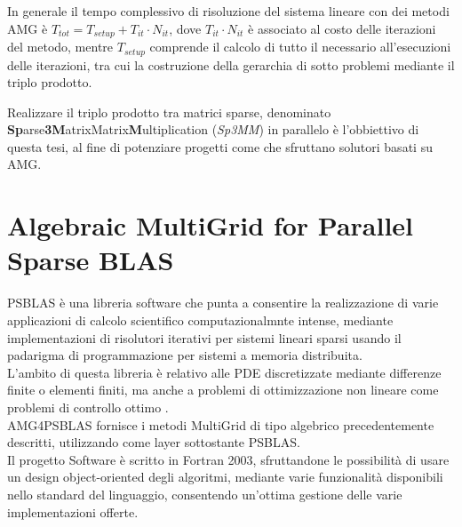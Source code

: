 In generale il tempo complessivo di risoluzione del sistema lineare con dei metodi AMG è  $T_{tot} = T_{setup} + T_{it}\cdot N_{it}$,
dove $T_{it}\cdot N_{it}$ è associato al costo delle iterazioni del metodo, 
mentre $T_{setup}$ comprende il calcolo di tutto il necessario all'esecuzioni delle iterazioni,
tra cui la costruzione della gerarchia di sotto problemi mediante il triplo prodotto.\\ %
\par\null\par
Realizzare il triplo prodotto tra matrici sparse, denominato \\{\bf{Sp}}arse{\bf{3}}{\bf{M}}atrixMatrix{\bf{M}}ultiplication (\emph{Sp3MM})
in parallelo è l'obbiettivo di questa tesi, al fine di potenziare progetti come  che sfruttano solutori basati su AMG.\\
\section{Algebraic MultiGrid for Parallel Sparse BLAS} \label{amg4psblas}
PSBLAS è una libreria software che punta a consentire la realizzazione di varie applicazioni di calcolo scientifico computazionalmnte intense,
mediante implementazioni di risolutori iterativi per sistemi lineari sparsi 
usando il padarigma di programmazione per sistemi a memoria distribuita.\\
L'ambito di questa libreria è relativo alle PDE discretizzate mediante differenze finite o elementi finiti,
ma anche a problemi di ottimizzazione non lineare come problemi di controllo ottimo .\\
AMG4PSBLAS  fornisce i metodi MultiGrid di tipo algebrico precedentemente descritti,
utilizzando come layer sottostante PSBLAS.\\
Il progetto Software è scritto in Fortran 2003, sfruttandone le possibilità di 
usare un design object-oriented degli algoritmi, mediante varie funzionalità disponibili nello standard del linguaggio,
consentendo un'ottima gestione delle varie implementazioni offerte. 
